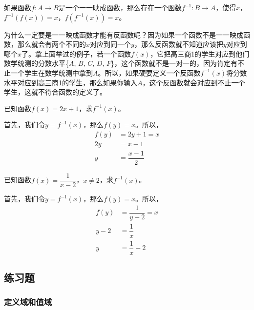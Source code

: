 \documentclass[UTF8]{ctexart}
\begin{document}
\begin{info}[反函数的定义]
    如果函数$f: A \to B$是一个一一映成函数，那么存在一个函数$f^{-1}: B \to A$，使得$x$，$f^{-1}(f(x)) = x$，$f(f^{-1}(x)) = x$。
\end{info}

为什么一定要是一一映成函数才能有反函数呢？因为如果一个函数不是一一映成函数，那么就会有两个不同的$x$对应到同一个$y$，那么反函数就不知道应该把$y$对应到哪个$x$了。拿上面举过的例子，若一个函数$f(x)$，它把高三商1的学生对应到他们数学统测的分数水平\{$A$, $B$, $C$, $D$, $F$\}，这个函数就不是一对一的，因为肯定有不止一个学生在数学统测中拿到$A$。所以，如果硬要定义一个反函数$f^{-1}(x)$将分数水平对应到高三商1的学生，那么如果你输入$A$，这个反函数就会对应到不止一个学生，这就不符合函数的定义了。

\begin{question}
    已知函数$f(x) = 2x + 1$，求$f^{-1}(x)$。
\end{question}

\begin{solution}
    首先，我们令$y = f^{-1}(x)$，那么$f(y) = x$。所以，
    \begin{align*}
        f(y) &= 2y + 1 = x\\
        2y &= x - 1\\
        y &= \dfrac{x - 1}{2}
    \end{align*}
\end{solution}

\begin{question}
    已知函数$f(x) = \dfrac{1}{x - 2}$，$x \neq 2$，求$f^{-1}(x)$。
\end{question}

\begin{solution}
    首先，我们令$y = f^{-1}(x)$，那么$f(y) = x$。所以，
    \begin{align*}
        f(y) &= \dfrac{1}{y - 2} = x\\
        y - 2 &= \dfrac{1}{x}\\
        y &= \dfrac{1}{x} + 2
    \end{align*}
\end{solution}

\subsection*{练习题}

\subsubsection*{定义域和值域}
\end{document}
